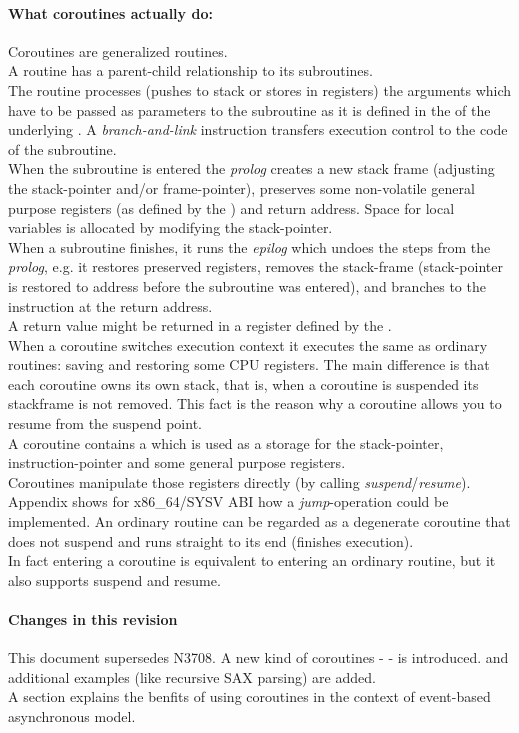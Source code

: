 \paragraph*{What coroutines actually do:}
Coroutines are generalized routines.\\
\newline
A routine has a parent-child relationship to its subroutines.\\
The routine processes (pushes to stack or stores in registers) the arguments which
have to be passed as parameters to the subroutine as it is defined in the \cv
of the underlying \ABI. A \textit{branch-and-link} instruction transfers
execution control to the code of the subroutine.\\
When the subroutine is entered the \textit{prolog} creates a new stack frame
(adjusting the stack-pointer and/or frame-pointer), preserves some
non-volatile general purpose registers (as defined by the \cv) and return
address. Space for local variables is allocated by modifying the
stack-pointer.\\
When a subroutine  finishes, it runs the \textit{epilog} which undoes the steps
from the \textit{prolog}, e.g. it restores preserved registers, removes the
stack-frame (stack-pointer is restored to address before the subroutine was entered),
and branches to the instruction at the return address.\\
A return value might be returned in a register defined by the \cv.\\
\newline
When a coroutine switches execution context it executes the same as
ordinary routines: saving and restoring some CPU registers. The main
difference is that each coroutine owns its own stack, that is, when a coroutine is
suspended its stackframe is not removed. This fact is the reason why a coroutine
allows you to resume from the suspend point.\\ A coroutine contains a
\cblock which is used as a storage for the stack-pointer, instruction-pointer and
some general purpose registers.\\ Coroutines manipulate those registers directly
(by calling \textit{suspend}/\textit{resume}).\\
Appendix  shows for x86\_64/SYSV ABI how a
\textit{jump}-operation could be implemented.
\newline
An ordinary routine can be regarded as a degenerate coroutine that
does not suspend and runs straight to its end (finishes execution).\\
\newline
In fact entering a coroutine is equivalent to entering an ordinary routine, but
it also supports suspend and resume.

\paragraph*{Changes in this revision}
This document supersedes N3708. A new kind of coroutines - \scoro - is introduced.
and additional examples (like recursive SAX parsing) are added.\\
A section explains the benfits of using coroutines in the context of event-based
asynchronous model.
